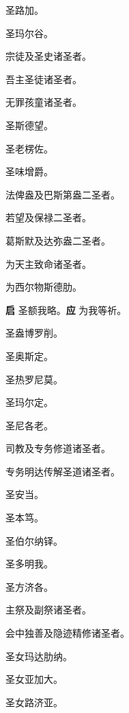 \documentclass[UTF8,17pt]{ctexart}
\begin{document}
 圣路加。

 圣玛尔⾕。

 宗徒及圣史诸圣者。

 吾主圣徒诸圣者。

 ⽆罪孩童诸圣者。

 圣斯德望。

 圣⽼楞佐。

 圣味增爵。

 法俾盎及巴斯第盎⼆圣者。

 若望及保禄⼆圣者。

 葛斯默及达弥盎⼆圣者。

 为天主致命诸圣者。

 为西尔物斯德肋。

\textbf{启} \quad 圣额我略。\hfill \textbf{应} \quad 为我等祈。

 圣盎博罗削。

 圣奥斯定。

 圣热罗尼莫。

 圣玛尔定。

 圣尼各⽼。

 司教及专务修道诸圣者。

 专务明达传解圣道诸圣者。

 圣安当。

 圣本笃。

 圣伯尔纳铎。

 圣多明我。

 圣⽅济各。

 主祭及副祭诸圣者。

 会中独善及隐迹精修诸圣者。

 圣⼥玛达肋纳。

 圣⼥亚加⼤。

 圣⼥路济亚。
\end{document}
